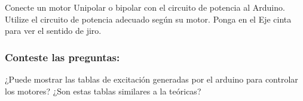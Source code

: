 Conecte un motor Unipolar o bipolar con el circuito de potencia al Arduino. Utilize el circuito de potencia adecuado según su motor. Ponga en el Eje cinta para ver el sentido de jiro.

\subsubsection{Conteste las preguntas:} 

¿Puede mostrar las tablas de excitación generadas por el arduino para controlar los motores?
¿Son estas tablas similares a la teóricas?

%
% 
% 
% 



%



